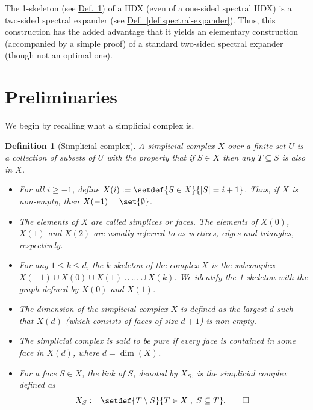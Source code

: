 \documentclass[11pt]{article}
\newcommand{\expref}[2]{\texorpdfstring{\hyperref[#2]{#1~\ref{#2}}}{#1~\ref{#2}}}
\newtheorem{definition}[theorem]{Definition}
\begin{document}
%
The 1-skeleton (see \expref{Def.}{def:simplicial-complex}) %
of a HDX %
(even of a one-sided spectral HDX) is a 
two-sided spectral expander (see \expref{Def.}{def:spectral-expander}). %
Thus, this construction has the added advantage that it yields an elementary 
construction (accompanied by a simple proof) of a standard two-sided spectral
expander (though not an optimal one).  %
%
%
%

%

\section{Preliminaries}

We begin by recalling what a simplicial complex is. 
\begin{definition}[Simplicial complex]   \label{def:simplicial-complex}
  A \emph{simplicial complex} $X$ over a finite set $U$ is a collection of subsets of $U$ with the property that if $S \in X$ then any $T \subseteq S$ is also in $X$.
  \begin{itemize}
  \item For all $i\geq -1$,
    define $X(i) := \setdef{S \in X}{|S| = i+1}$. Thus, if $X$ is
    non-empty, then $X(-1) = \set{\emptyset}$. 
  \item The elements of $X$ are called \emph{simplices} or
    \emph{faces}. The elements of $X(0)$, $X(1)$ and $X(2)$ are
    usually referred to as \emph{vertices}, \emph{edges} and
    \emph{triangles}, respectively.  %
%
%
%
%
%
%
    \item For any $1 \leq k \leq d$, the \emph{$k$-skeleton} of the complex
    $X$ is the subcomplex $X(-1) \cup X(0) \cup X(1) \cup \dots \cup X(k)$.
      We identify the \emph{1-skeleton} with the graph defined by $X(0)$ and
      $X(1)$.   %
  \item The \emph{dimension} of the simplicial complex $X$ is defined as the largest $d$ such that $X(d)$ (which consists of faces of size $d+1$) is non-empty.
  \item The simplicial complex is said to be \emph{pure} if every face
    is contained in some face in $X(d)$, where $d = \dim(X)$.
    
  \item For a face $S \in X$, the \emph{link} of $S$, denoted by
    $X_S$, is the simplicial complex defined as 
    \[
      X_S := \setdef{T \setminus S}{T\in X\;,\; S \subseteq
        T}. \qedhere\
    \]
  \end{itemize}
\end{definition}
\end{document}
